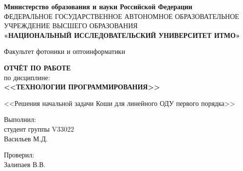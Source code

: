 \thispagestyle{empty}

\begin{center}
    \textbf{Министерство образования и науки Российской Федерации} \\
    ФЕДЕРАЛЬНОЕ ГОСУДАРСТВЕННОЕ АВТОНОМНОЕ ОБРАЗОВАТЕЛЬНОЕ УЧРЕЖДЕНИЕ ВЫСШЕГО ОБРАЗОВАНИЯ \\
    \textbf{\small{«НАЦИОНАЛЬНЫЙ ИССЛЕДОВАТЕЛЬСКИЙ УНИВЕРСИТЕТ ИТМО»}}
    \end{center}
    
\begin{center}
    Факультет фотоники и оптоинформатики
\end{center}

\vspace{0.1\paperheight}

\begin{center}
    \textbf{ОТЧЁТ ПО РАБОТЕ} \\
    по дисциплине: \\
    \textbf{<<ТЕХНОЛОГИИ ПРОГРАММИРОВАНИЯ>>}
\end{center}

\begin{center}
    <<Решения начальной задачи Коши для линейного ОДУ первого порядка>>
\end{center}

\vspace{0.1\paperheight}

\begin{flushright}
    Выполнил: \\
    студент группы V33022 \\
    Васильев М.Д.
\end{flushright}

\begin{flushright}
    Проверил: \\
    Залипаев В.В.
\end{flushright}

\vspace{0pt plus4fill}

\newpage